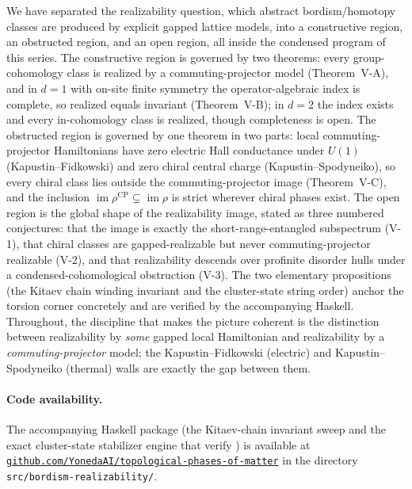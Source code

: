 \documentclass[12pt]{article}
\newcommand{\real}{\rho}                         %
\newcommand{\CP}{\mathrm{CP}}                    %
\newcommand{\im}{\operatorname{im}}
\theoremstyle{definition}
\theoremstyle{remark}
\begin{document}
We have separated the realizability question, which abstract bordism/homotopy classes are
produced by explicit gapped lattice models, into a constructive region, an obstructed
region, and an open region, all inside the condensed program of this series. The constructive
region is governed by two theorems: every group-cohomology class is realized by a
commuting-projector model (Theorem~V-A), and in $d=1$ with on-site finite symmetry the
operator-algebraic index is complete, so realized equals invariant (Theorem~V-B); in $d=2$ the
index exists and every in-cohomology class is realized, though completeness is open. The
obstructed region is governed by one theorem in two parts: local commuting-projector
Hamiltonians have zero electric Hall conductance under $U(1)$ (Kapustin--Fidkowski) and zero
chiral central charge (Kapustin--Spodyneiko), so every chiral class lies outside the
commuting-projector image (Theorem~V-C), and the inclusion
$\im\real^{\CP}\subsetneq\im\real$ is strict wherever chiral phases exist. The open region is the global shape of the realizability image, stated as three
numbered conjectures: that the image is exactly the short-range-entangled subspectrum
(V-1), that chiral classes are gapped-realizable but never commuting-projector realizable
(V-2), and that realizability descends over profinite disorder hulls under a
condensed-cohomological obstruction (V-3). The two elementary propositions (the Kitaev
chain winding invariant and the cluster-state string order) anchor the torsion corner
concretely and are verified by the accompanying Haskell. Throughout, the discipline that
makes the picture coherent is the distinction between realizability by \emph{some} gapped
local Hamiltonian and realizability by a \emph{commuting-projector} model; the
Kapustin--Fidkowski (electric) and Kapustin--Spodyneiko (thermal) walls are exactly the gap
between them.

\paragraph{Code availability.}
{
\begin{sloppypar}
The accompanying Haskell package (the Kitaev-chain invariant sweep and the exact
cluster-state stabilizer engine that verify ) is available
at \href{https://github.com/YonedaAI/topological-phases-of-matter}{\nolinkurl{github.com/YonedaAI/topological-phases-of-matter}}
in the directory \texttt{src/bordism-realizability/}.
\end{sloppypar}}

{}


\end{document}
